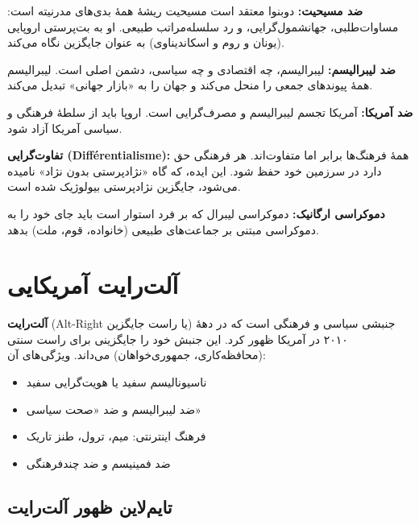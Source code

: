 \textbf{ضد مسیحیت:}
دوبنوا معتقد است مسیحیت ریشهٔ همهٔ بدی‌های مدرنیته است: مساوات‌طلبی، جهانشمول‌گرایی، و رد سلسله‌مراتب طبیعی. او به بت‌پرستی اروپایی (یونان و روم و اسکاندیناوی) به عنوان جایگزین نگاه می‌کند.

\textbf{ضد لیبرالیسم:}
لیبرالیسم، چه اقتصادی و چه سیاسی، دشمن اصلی است. لیبرالیسم همهٔ پیوندهای جمعی را منحل می‌کند و جهان را به «بازار جهانی» تبدیل می‌کند.

\textbf{ضد آمریکا:}
آمریکا تجسم لیبرالیسم و مصرف‌گرایی است. اروپا باید از سلطهٔ فرهنگی و سیاسی آمریکا آزاد شود.

\textbf{تفاوت‌گرایی (Différentialisme):}
همهٔ فرهنگ‌ها برابر اما متفاوت‌اند. هر فرهنگی حق دارد در سرزمین خود حفظ شود. این ایده، که گاه «نژادپرستی بدون نژاد» نامیده می‌شود، جایگزین نژادپرستی بیولوژیک شده است.

\textbf{دموکراسی ارگانیک:}
دموکراسی لیبرال که بر فرد استوار است باید جای خود را به دموکراسی مبتنی بر جماعت‌های طبیعی (خانواده، قوم، ملت) بدهد.


\section{آلت‌رایت آمریکایی}

\begin{tcolorbox}[
    enhanced,
    colback=rightblue!8,
    colframe=rightblue,
    boxrule=1.5pt,
    arc=5pt,
    fonttitle=\bfseries,
    title={\rl{🔵 تعریف کلیدی: آلت‌رایت}}
]
\textbf{آلت‌رایت} (Alt-Right یا راست جایگزین) جنبشی سیاسی و فرهنگی است که در دههٔ ۲۰۱۰ در آمریکا ظهور کرد. این جنبش خود را جایگزینی برای راست سنتی (محافظه‌کاری، جمهوری‌خواهان) می‌داند. ویژگی‌های آن:
\begin{itemize}
    \item ناسیونالیسم سفید یا هویت‌گرایی سفید
    \item ضد لیبرالیسم و ضد «صحت سیاسی»
    \item فرهنگ اینترنتی: میم، ترول، طنز تاریک
    \item ضد فمینیسم و ضد چندفرهنگی
\end{itemize}
\end{tcolorbox}

\subsection{تایم‌لاین ظهور آلت‌رایت}

